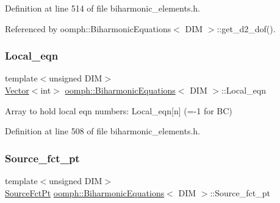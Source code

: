 Definition at line 514 of file biharmonic\+\_\+elements.\+h.



Referenced by oomph\+::\+Biharmonic\+Equations$<$ D\+I\+M $>$\+::get\+\_\+d2\+\_\+dof().

\mbox{\label{classoomph_1_1BiharmonicEquations_aee9ddb4f76f29a946c524d0280b13747}} 
\subsubsection{\texorpdfstring{Local\+\_\+eqn}{Local\_eqn}}
{\footnotesize\ttfamily template$<$unsigned D\+IM$>$ \\
\hyperlink{classoomph_1_1Vector}{Vector}$<$int$>$ \hyperlink{classoomph_1_1BiharmonicEquations}{oomph\+::\+Biharmonic\+Equations}$<$ D\+IM $>$\+::Local\+\_\+eqn\hspace{0.3cm}{\ttfamily [protected]}}



Array to hold local eqn numbers\+: Local\+\_\+eqn\mbox{[}n\mbox{]} (=-\/1 for BC) 



Definition at line 508 of file biharmonic\+\_\+elements.\+h.

\mbox{\label{classoomph_1_1BiharmonicEquations_a2711ff2523edd383374fd7ff5692ae48}} 
\subsubsection{\texorpdfstring{Source\+\_\+fct\+\_\+pt}{Source\_fct\_pt}}
{\footnotesize\ttfamily template$<$unsigned D\+IM$>$ \\
\hyperlink{classoomph_1_1BiharmonicEquations_aafa48cd7bbc8ce4383224d1d2d0bfda3}{Source\+Fct\+Pt} \hyperlink{classoomph_1_1BiharmonicEquations}{oomph\+::\+Biharmonic\+Equations}$<$ D\+IM $>$\+::Source\+\_\+fct\+\_\+pt\hspace{0.3cm}{\ttfamily [protected]}}



